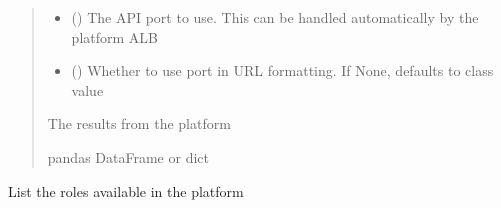 \documentclass[letterpaper,10pt,english]{sphinxmanual}
\begin{document}
\begin{fulllineitems}
\begin{fulllineitems}
\begin{quote}
\begin{description}
\begin{itemize}
\item {} 
\sphinxAtStartPar
{} (\sphinxstyleliteralemphasis{\sphinxupquote{ (}}\sphinxstyleliteralemphasis{\sphinxupquote{)}}) \textendash{} The API port to use. This can be handled automatically by the platform ALB

\item {} 
\sphinxAtStartPar
{} (\sphinxstyleliteralemphasis{\sphinxupquote{ (}}\sphinxstyleliteralemphasis{\sphinxupquote{)}}) \textendash{} Whether to use port in URL formatting. If None, defaults to class value

\end{itemize}

\sphinxAtStartPar
{} \textendash{} The results from the platform

\sphinxAtStartPar
pandas DataFrame or dict

\end{description}\end{quote}

\end{fulllineitems}


\begin{fulllineitems}
\label{\detokenize{aisquared.platform:aisquared.platform.AISquaredPlatformClient.AISquaredPlatformClient.list_roles}}
\pysigstartsignatures
{}
\pysigstopsignatures
\sphinxAtStartPar
List the roles available in the platform


\end{fulllineitems}
\end{fulllineitems}
\end{document}
